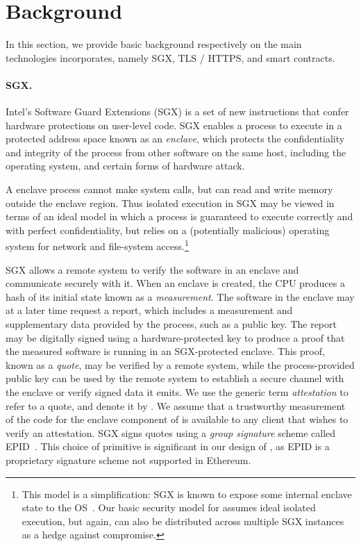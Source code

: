\vspace{-3mm}
\section{Background}
\label{sec:background}

In this section, we provide basic background respectively on the main technologies \tc incorporates, namely SGX, TLS / HTTPS, and smart contracts.

\vspace{-2mm}
\paragraph{\bf SGX.}
Intel's Software Guard Extensions (SGX) is a set of new instructions that confer hardware protections on user-level code. SGX enables a process to execute in a protected address space known as an {\em enclave}, which protects the confidentiality and integrity of the process from other software on the same host, including the operating system, and certain forms of hardware attack. 

A enclave process cannot make system calls, but can read and write memory outside the enclave region. Thus isolated execution in SGX may be viewed in terms of an ideal model in which a process is guaranteed to execute correctly and with perfect confidentiality, but relies on a (potentially malicious) operating system for network and file-system access.\footnote{This model is a simplification: SGX is known to expose some internal enclave state to the OS~\cite{sgxexplained}. Our basic security model for \tc assumes ideal isolated execution, but again, \tc can also be distributed across multiple SGX instances as a hedge against compromise.}

SGX allows a remote system to verify the software in an enclave and communicate securely with it. When an enclave is created, the CPU produces a hash of its initial state known as a {\em measurement}. The software in the enclave may at a later time request a report, which includes a measurement and supplementary data provided by the process, such as a public key. The report may be digitally signed using a hardware-protected key to produce a proof that the measured software is running in an SGX-protected enclave. This proof, known as a {\em quote}, may be verified by a remote system, while the process-provided public key can be used by the remote system to establish a secure channel with the enclave or verify signed data it emits. We use the generic term {\em attestation} to refer to a quote, and denote it by \att. We assume that a trustworthy measurement of the code for the enclave component of \tc is available to any client that wishes to verify an attestation. SGX signs quotes using a \emph{group signature} scheme called EPID~\cite{}. This choice of primitive is significant in our design of \tcs, as EPID is a proprietary signature scheme not supported in Ethereum.

